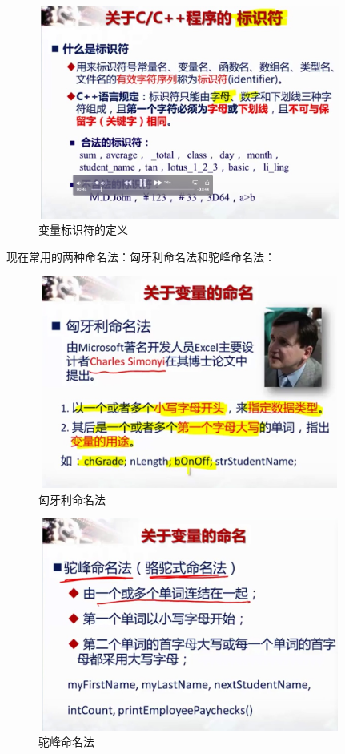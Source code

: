 \documentclass[UTF8]{article}
\begin{document}
\begin{figure}[!htb]
\centering
\includegraphics[width=10cm,height=7cm]{bianliangname.jpg}
\caption{变量标识符的定义}
\hspace{0.05in}
\end{figure}
现在常用的两种命名法：匈牙利命名法和驼峰命名法：
\begin{figure}[!htb]
\centering
\includegraphics[width=10cm,height=7cm]{xiongyali.jpg}
\caption{匈牙利命名法}
\hspace{0.05in}
\end{figure}
\begin{figure}[!htb]
\centering
\includegraphics[width=10cm,height=7cm]{tuofeng.jpg}
\caption{驼峰命名法}
\hspace{0.05in}
\end{figure}
\end{document}
